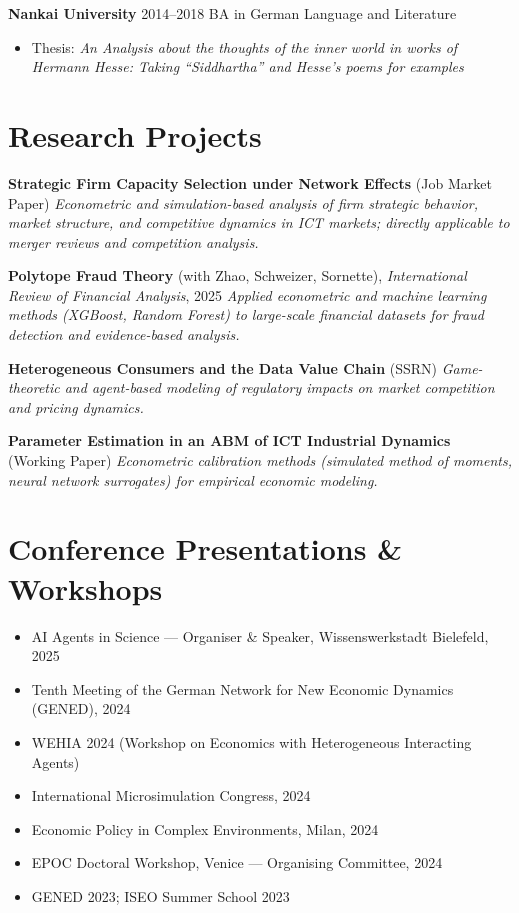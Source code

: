 \documentclass[a4paper,11pt]{article}
\begin{document}
\textbf{Nankai University} \hfill 2014–2018  
\newline BA in German Language and Literature
\begin{itemize}
    \item Thesis: \textit{An Analysis about the thoughts of the inner world in works of Hermann Hesse: Taking “Siddhartha” and Hesse’s poems for examples}
\end{itemize}


\section{Research Projects}

\textbf{Strategic Firm Capacity Selection under Network Effects} (Job Market Paper)  
\emph{Econometric and simulation-based analysis of firm strategic behavior, market structure, and competitive dynamics in ICT markets; directly applicable to merger reviews and competition analysis.}

\textbf{Polytope Fraud Theory} (with Zhao, Schweizer, Sornette), \emph{International Review of Financial Analysis}, 2025  
\emph{Applied econometric and machine learning methods (XGBoost, Random Forest) to large-scale financial datasets for fraud detection and evidence-based analysis.}

\textbf{Heterogeneous Consumers and the Data Value Chain} (SSRN)  
\emph{Game-theoretic and agent-based modeling of regulatory impacts on market competition and pricing dynamics.}

\textbf{Parameter Estimation in an ABM of ICT Industrial Dynamics} (Working Paper)  
\emph{Econometric calibration methods (simulated method of moments, neural network surrogates) for empirical economic modeling.}

\section{Conference Presentations \& Workshops}

\begin{itemize}
\item AI Agents in Science — Organiser \& Speaker, Wissenswerkstadt Bielefeld, 2025  
\item Tenth Meeting of the German Network for New Economic Dynamics (GENED), 2024  
\item WEHIA 2024 (Workshop on Economics with Heterogeneous Interacting Agents)  
\item International Microsimulation Congress, 2024  
\item Economic Policy in Complex Environments, Milan, 2024  
\item EPOC Doctoral Workshop, Venice — Organising Committee, 2024  
\item GENED 2023; ISEO Summer School 2023  
\end{itemize}
\end{document}

